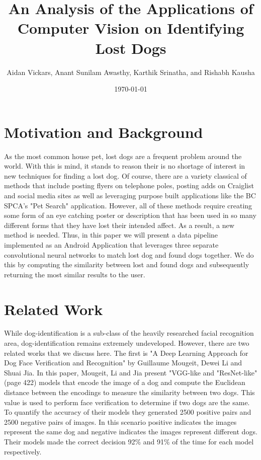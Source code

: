 \documentclass{article}
\title{An Analysis of the Applications of Computer Vision on Identifying Lost Dogs}
\author{Aidan Vickars, Anant Sunilam Awasthy, Karthik Srinatha, and Rishabh Kausha}
\date{\today}
\begin{document}
\maketitle

\newpage

\tableofcontents

\newpage
\section{Motivation and Background}
As the most common house pet, lost dogs are a frequent problem around the world.  With this is mind, it stands to reason their is no shortage of interest in new techniques for finding a lost dog.  Of course, there are a variety classical of methods that include posting flyers on telephone poles, posting adds on Craiglist and social media sites as well as leveraging purpose built applications like the BC SPCA's "Pet Search" application.  However, all of these methods require creating some form of an eye catching poster or description that has been used in so many different forms that they have lost their intended affect.  As a result, a new method is needed.  Thus, in this paper we will present a data pipeline implemented as an Android Application that leverages three separate convolutional neural networks to match lost dog and found dogs together.  We do this by computing the similarity between lost and found dogs and subsequently returning the most similar results to the user.

\section{Related Work}
	While dog-identification is a sub-class of the heavily researched facial recognition area, dog-identification remains extremely undeveloped.  However, there are two related works that we discuss here.  The first is "A Deep Learning Approach for Dog Face Verification and Recognition" \cite{MougeotGuillaume2019ADLA}  by  Guillaume Mougeit, Dewei Li and Shuai Jia.  In this paper, Mougeit, Li and Jia present "VGG-like and "ResNet-like" (page 422) models that encode the image of a dog and compute the Euclidean distance between the encodings to measure the similarity between two dogs.  This value is used to perform face verification to determine if two dogs are the same.  To quantify the accuracy of their models they generated 2500 positive pairs and 2500 negative pairs of images.  In this scenario positive indicates the images represent the same dog and negative indicates the images represent different dogs.  Their models made the correct decision 92\% and 91\% of the time for each model respectively.
\end{document}

